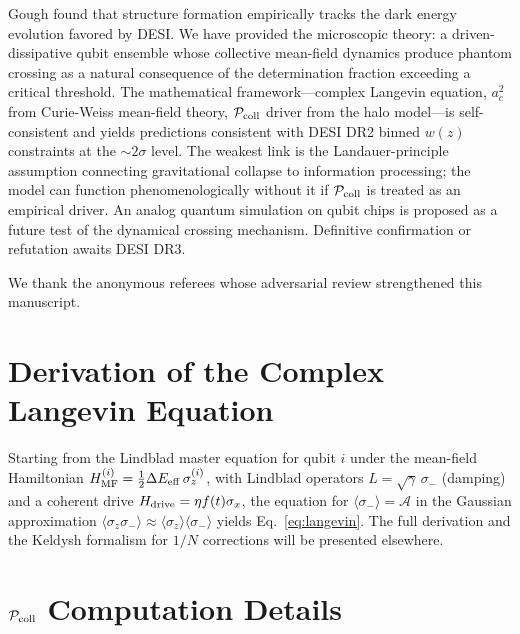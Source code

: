 \documentclass[aps,prd,twocolumn,superscriptaddress]{revtex4-2}
\begin{document}
Gough \cite{Gough:2025} found that structure formation empirically tracks the dark energy evolution favored by DESI. We have provided the microscopic theory: a driven-dissipative qubit ensemble whose collective mean-field dynamics produce phantom crossing as a natural consequence of the determination fraction exceeding a critical threshold. The mathematical framework---complex Langevin equation, $a_c^2$ from Curie-Weiss mean-field theory, $\mathcal{P}_{\rm coll}$ driver from the halo model---is self-consistent and yields predictions consistent with DESI DR2 binned $w(z)$ constraints at the $\sim 2\sigma$ level. The weakest link is the Landauer-principle assumption connecting gravitational collapse to information processing; the model can function phenomenologically without it if $\mathcal{P}_{\rm coll}$ is treated as an empirical driver. An analog quantum simulation on qubit chips is proposed as a future test of the dynamical crossing mechanism. Definitive confirmation or refutation awaits DESI DR3.

\begin{acknowledgments}
We thank the anonymous referees whose adversarial review strengthened this manuscript.
\end{acknowledgments}

\appendix

\section{Derivation of the Complex Langevin Equation}
\label{app:langevin}

Starting from the Lindblad master equation for qubit $i$ under the mean-field Hamiltonian $H_{\rm MF}^{(i)} = \frac{1}{2}\Delta E_{\rm eff}\,\sigma_z^{(i)}$, with Lindblad operators $L = \sqrt{\gamma}\,\sigma_-$ (damping) and a coherent drive $H_{\rm drive} = \eta f(t)\sigma_x$, the equation for $\langle\sigma_-\rangle = \mathcal{A}$ in the Gaussian approximation $\langle\sigma_z\sigma_-\rangle \approx \langle\sigma_z\rangle\langle\sigma_-\rangle$ yields Eq.~\eqref{eq:langevin}. The full derivation and the Keldysh formalism for $1/N$ corrections will be presented elsewhere.

\section{$\mathcal{P}_{\rm coll}$ Computation Details}
\label{app:pcoll}
\end{document}
